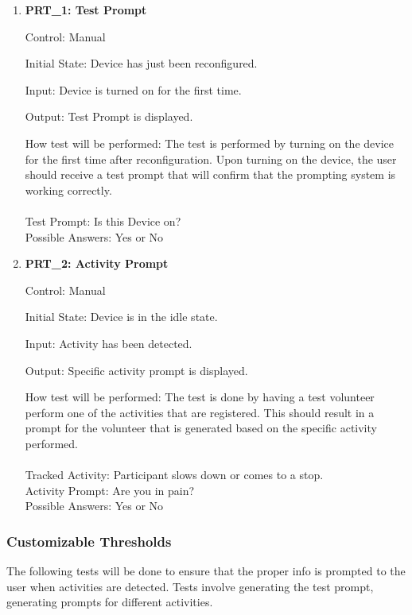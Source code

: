\documentclass[12pt, titlepage]{article}
\begin{document}
\begin{enumerate}
	\item{\textbf{PRT\_1: Test Prompt} \\}\label{PRT1}
	
		Control: Manual 
							
		Initial State: Device has just been reconfigured.
							
		Input: Device is turned on for the first time.
		
		Output: Test Prompt is displayed.

		How test will be performed: The test is performed by turning on the device for the first time after reconfiguration. Upon turning on the device, the user should receive a test prompt that will confirm that the 				prompting system is working correctly.\\\\
		Test Prompt: Is this Device on?\\
		Possible Answers: Yes or No
		
	\item{\textbf{PRT\_2: Activity Prompt} \\}\label{PRT2}
	
		Control: Manual 
							
		Initial State: Device is in the idle state.
							
		Input: Activity has been detected.
		
		Output: Specific activity prompt is displayed.
							
		How test will be performed: The test is done by having a test volunteer perform one of the activities that are registered. This should result in a prompt for the volunteer that is generated based on the 					specific activity performed.\\\\
		Tracked Activity: Participant slows down or comes to a stop.\\
		Activity Prompt: Are you in pain?\\
		Possible Answers: Yes or No
\end{enumerate}

\subsubsection{Customizable Thresholds}

The following tests will be done to ensure that the proper info is prompted to the user when activities are detected. Tests involve generating the test prompt, generating prompts for different activities.
		
\end{document}
